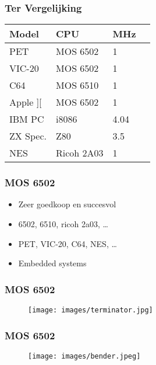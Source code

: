 \documentclass[aspectratio=43]{uva-inf-presentation}
\begin{document}

\begin{frame}
\frametitle{Ter Vergelijking}

\begin{tabular}{|l|l|l|l|}
\hline Model & CPU & MHz \\ \hline
PET & MOS 6502 & 1 \\ 
VIC-20 & MOS 6502 & 1 \\ 
C64 & MOS 6510 & 1 \\ \hline
Apple ][ & MOS 6502 & 1 \\
IBM PC & i8086 & 4.04 \\
ZX Spec. & Z80 & 3.5 \\ \hline
NES & Ricoh 2A03 & 1 \\ \hline
\end{tabular}

\end{frame}


\begin{frame}
\frametitle{MOS 6502}

\begin{itemize}
\item Zeer goedkoop en succesvol
\item 6502, 6510, ricoh 2a03, \dots
\item PET, VIC-20, C64, NES, \dots
\item Embedded systems
\end{itemize}

\end{frame}


\begin{frame}
\frametitle{MOS 6502}

\begin{figure}
\texttt{[image: images/terminator.jpg]}
\end{figure}

\end{frame}


\begin{frame}
\frametitle{MOS 6502}

\begin{figure}
\texttt{[image: images/bender.jpeg]}
\end{figure}

\end{frame}
\end{document}
